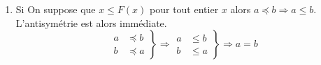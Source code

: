\begin{enumerate}
\begin{enumerate}
 \item Si On suppose que $x \leq F(x)$ pour tout entier $x$ alors $a \preceq b \Rightarrow a \leq b$. L'antisymétrie est alors immédiate.
\begin{displaymath}
\left. 
\begin{aligned}
 a &\preceq b \\ b &\preceq a
\end{aligned}
\right\rbrace   \Rightarrow 
\left. 
\begin{aligned}
 a &\leq b \\ b &\leq a
\end{aligned}
\right\rbrace   \Rightarrow 
a = b
\end{displaymath}

\end{enumerate}

\end{enumerate}

